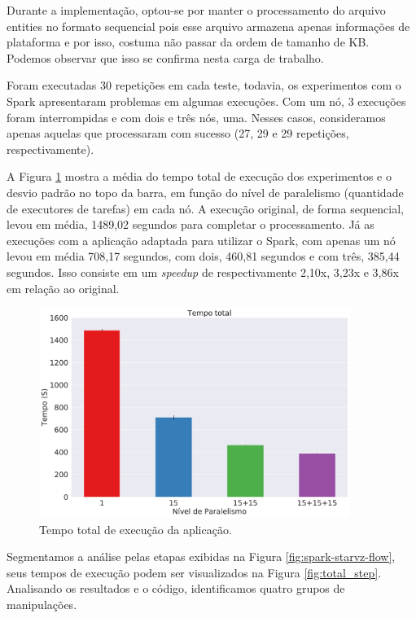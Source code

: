 Durante a implementação, optou-se por manter o processamento do arquivo entities 
no formato sequencial pois esse arquivo armazena apenas informações de 
plataforma e por isso, costuma não passar da ordem de tamanho de KB. Podemos 
observar que isso se confirma nesta carga de trabalho.


Foram executadas 30 repetições em cada teste, todavia, os experimentos com o 
Spark apresentaram problemas em algumas execuções. Com um nó, 3 execuções foram 
interrompidas e com dois e três nós, uma. Nesses casos, consideramos apenas 
aquelas que processaram com sucesso (27, 29 e 29 repetições, respectivamente). 

A Figura \ref{fig:total_full} mostra a média do tempo total de execução dos 
experimentos e o desvio padrão no topo da barra, em função do nível de 
paralelismo (quantidade de executores de tarefas) em cada nó. A execução 
original, de forma sequencial, levou em média, 1489,02 segundos para completar 
o processamento. Já as execuções com a aplicação adaptada para utilizar o 
Spark, com apenas um nó levou em média 708,17 segundos, com dois, 460,81 
segundos e com três, 385,44 segundos. Isso consiste em um \emph{speedup} de 
respectivamente 2,10x, 3,23x e 3,86x em relação ao original.

\begin{figure}[ht]
\centerline{
\includegraphics[width=0.9\textwidth]{./img/total.pdf}}
 \caption{Tempo total de execução da aplicação.}
 \label{fig:total_full}
\end{figure}


Segmentamos a análise pelas etapas exibidas na Figura 
\ref{fig:spark-starvz-flow}, seus tempos de execução podem ser visualizados na 
Figura \ref{fig:total_step}. Analisando os resultados e o código, identificamos 
quatro grupos de manipulações.

